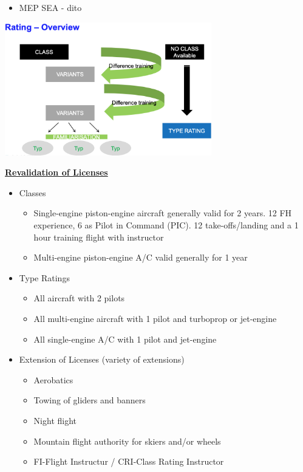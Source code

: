 \documentclass[9pt, landscape, fleqn]{scrartcl}
\begin{document}
\begin{multicols*}{3}
\begin{itemize}
\begin{itemize}
    \end{itemize} 
    \item MEP SEA - dito 
\end{itemize}
\begin{center}
    \includegraphics[width=9cm]{Images/Ratings.png}
\end{center}
\underline{\textbf{Revalidation of Licenses}}
\begin{itemize}
    \item Classes
    \begin{itemize}
        \item Single-engine piston-engine aircraft generally valid for 2 years. 12 FH experience, 6 as Pilot in Command (PIC). 12 take-offs/landing and a 1 hour training flight with instructor
        \item Multi-engine piston-engine A/C valid generally for 1 year 
    \end{itemize}
    \item Type Ratings
    \begin{itemize}
        \item All aircraft with 2 pilots 
        \item All multi-engine aircraft with 1 pilot and turboprop or jet-engine 
        \item All single-engine A/C with 1 pilot and jet-engine
    \end{itemize}
    \item Extension of Licenses (variety of extensions)
    \begin{itemize}
        \item Aerobatics 
        \item Towing of gliders and banners 
        \item Night flight 
        \item Mountain flight authority for skiers and/or wheels 
        \item FI-Flight Instructur / CRI-Class Rating Instructor 

\end{itemize}
\end{itemize}
\end{multicols*}
\end{document}

